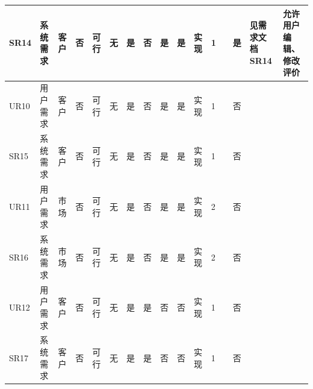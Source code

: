 \documentclass[a4paper]{ctexart}
\begin{document}
{\begin{longtable}{|P{4em}|P{4em}|P{2em}|P{2em}|P{2em}|P{1em}|P{3em}|P{3em}|P{4em}|P{4em}|P{2em}|P{2em}|P{3em}|P{3em}|P{4em}|P{4em}|}
  \hline
  SR14                                         & 系统需求                            & 客户                                         & 否                                            & 可行                    & 无   & 是           & 否           & 是             & 是             & 实现     & 1      &            & 是           & 见需求文档 SR14 & 允许用户编辑、修改评价 \\
  \hline
  UR10                                         & 用户需求                            & 客户                                         & 否                                            & 可行                    & 无   & 是           & 否           & 是             & 是             & 实现     & 1      &            & 否           &                 &                        \\
  \hline
  SR15                                         & 系统需求                            & 客户                                         & 否                                            & 可行                    & 无   & 是           & 否           & 是             & 是             & 实现     & 1      &            & 否           &                 &                        \\
  \hline
  UR11                                         & 用户需求                            & 市场                                         & 否                                            & 可行                    & 无   & 是           & 否           & 是             & 是             & 实现     & 2      &            & 否           &                 &                        \\
  \hline
  SR16                                         & 系统需求                            & 市场                                         & 否                                            & 可行                    & 无   & 是           & 否           & 是             & 是             & 实现     & 2      &            & 否           &                 &                        \\
  \hline
  UR12                                         & 用户需求                            & 客户                                         & 否                                            & 可行                    & 无   & 是           & 是           & 否             & 否             & 实现     & 1      &            & 否           &                 &                        \\
  \hline
  SR17                                         & 系统需求                            & 客户                                         & 否                                            & 可行                    & 无   & 是           & 是           & 否             & 否             & 实现     & 1      &            & 否           &                 &                        \\

\end{longtable}}
\end{document}
